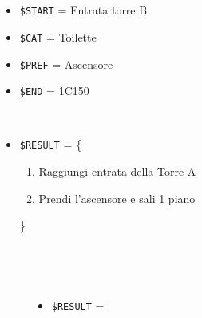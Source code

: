 \documentclass[../../Sperimentazione.tex]{subfiles}
\begin{document}
			\paragraph*{}
			\label{Prova2B.1}	
			\begin{tcolorbox}[fonttitle=\bfseries, 
								adjusted title={\Large Prova 2B.1}, 
								breakable, 
								sharp corners=south,
								colback=white, 
								colframe=white!60!black]
								
				\begin{description}[leftmargin=0.7cm,labelwidth=!]
				
					\item[Input] \ \par 
        				\begin{itemize}
        					\item \verb|$START| = Entrata torre B
							\item \verb|$CAT| = Toilette
							\item \verb|$PREF| = Ascensore
        					\item \verb|$END| = 1C150
        				\end{itemize}
        				
        			\tcbline 
        				
        			\item[Output atteso] \ \par
        				\begin{itemize}
        					\item \verb|$RESULT| = \{
        					\begin{enumerate}
        						\item Raggiungi entrata della Torre A
        						\item Prendi l'ascensore e sali 1 piano
        					\end{enumerate}
        					\}
        				\end{itemize}

					\tcbline        				
        				
        			\item[Output riscontrato] \ \par
        				\begin{description}
        				
        					\item[\dispositivoA] \ \par
        					\begin{itemize}
        						\item \verb|$RESULT| = \ns
        					\end{itemize}      					
        					

\end{description}
\end{description}
\end{tcolorbox}
\end{document}

